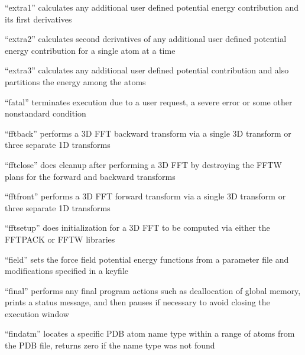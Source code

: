 \documentclass[letterpaper,11pt,english]{sphinxmanual}
\begin{document}

“extra1” calculates any additional user defined potential
energy contribution and its first derivatives


“extra2” calculates second derivatives of any additional
user defined potential energy contribution for a single
atom at a time


“extra3” calculates any additional user defined potential
contribution and also partitions the energy among the atoms


“fatal” terminates execution due to a user request, a severe
error or some other nonstandard condition


“fftback” performs a 3\sphinxhyphen{}D FFT backward transform via a single
3\sphinxhyphen{}D transform or three separate 1\sphinxhyphen{}D transforms


“fftclose” does cleanup after performing a 3\sphinxhyphen{}D FFT by destroying
the FFTW plans for the forward and backward transforms


“fftfront” performs a 3\sphinxhyphen{}D FFT forward transform via a single
3\sphinxhyphen{}D transform or three separate 1\sphinxhyphen{}D transforms


“fftsetup” does initialization for a 3\sphinxhyphen{}D FFT to be computed
via either the FFTPACK or FFTW libraries


“field” sets the force field potential energy functions from
a parameter file and modifications specified in a keyfile


“final” performs any final program actions such as deallocation
of global memory, prints a status message, and then pauses if
necessary to avoid closing the execution window


“findatm” locates a specific PDB atom name type within a
range of atoms from the PDB file, returns zero if the name
type was not found
\end{document}

